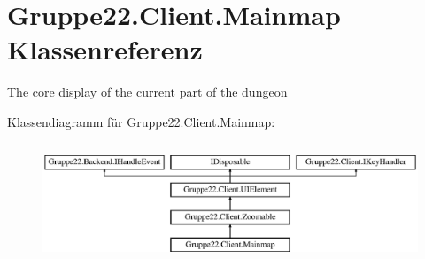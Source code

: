 \hypertarget{class_gruppe22_1_1_client_1_1_mainmap}{\section{Gruppe22.\-Client.\-Mainmap Klassenreferenz}
\label{class_gruppe22_1_1_client_1_1_mainmap}
}


The core display of the current part of the dungeon  


Klassendiagramm für Gruppe22.\-Client.\-Mainmap\-:\begin{figure}[H]
\begin{center}
\leavevmode
\includegraphics[height=3.589744cm]{class_gruppe22_1_1_client_1_1_mainmap}
\end{center}
\end{figure}
